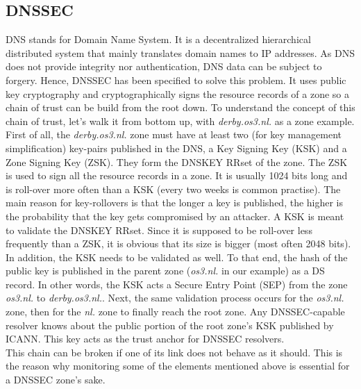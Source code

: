 \subsection{DNSSEC}
DNS stands for Domain Name System. It is a decentralized hierarchical distributed system that mainly translates domain names to IP addresses. As DNS does not provide integrity nor authentication, DNS data can be subject to forgery. Hence, DNSSEC has been specified to solve this problem. It uses public key cryptography and cryptographically signs the resource records of a zone so a chain of trust can be build from the root down.
To understand the concept of this chain of trust, let's walk it from bottom up, with \textit{derby.os3.nl.} as a zone example. 
\\
First of all, the \textit{derby.os3.nl.} zone must have at least two (for key management simplification) key-pairs published in the DNS, a Key Signing Key (KSK) and a Zone Signing Key (ZSK). They form the DNSKEY RRset of the zone. The ZSK is used to sign all the resource records in a zone. It is usually 1024 bits long and is roll-over more often than a KSK (every two weeks is common practise). The main reason for key-rollovers is that the longer a key is published, the higher is the probability that the key gets compromised by an attacker. A KSK is meant to validate the DNSKEY RRset. Since it is supposed to be roll-over less frequently than a ZSK, it is obvious that its size is bigger (most often 2048 bits). In addition, the KSK needs to be validated as well. To that end, the hash of the public key is published in the parent zone (\textit{os3.nl.} in our example) as a DS record. In other words, the KSK acts a Secure Entry Point (SEP) from the zone \textit{os3.nl.} to \textit{derby.os3.nl.}. Next, the same validation process occurs for the \textit{os3.nl.} zone, then for the \textit{nl.} zone to  finally reach the root zone. Any DNSSEC-capable resolver knows about the public portion of the root zone's KSK published by ICANN. This key acts as the trust anchor for DNSSEC resolvers.
\\
This chain can be broken if one of its link does not behave as it should. This is the reason why monitoring some of the elements mentioned above is essential for a DNSSEC zone's sake.           

